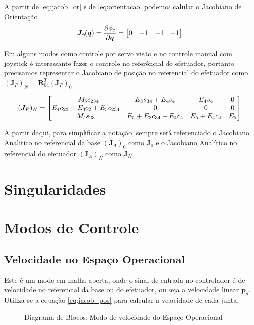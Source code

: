 A partir de \ref{eq:jacob_or} e de \ref{eq:orientacao} podemos calular o Jacobiano de Orientação
\begin{equation}
\bm{J}_{\phi}(\bm{q}) = \frac{\partial \phi_e}{\partial \bm{q}} = \begin{bmatrix}0 & -1 & -1 & -1\end{bmatrix}
\end{equation}
 
Em alguns modos como controle por servo visão e no controle manual com joystick é interessante fazer o controle no referêncial do efetuador, portanto precisamos representar o Jacobiano de posição no referencial do efetuador como $(\bm{J}_P)_N = \bm{R}_{04}^T (\bm{J}_P)_0$.  

\begin{equation}
(\bm{J}_P)_N =  
\begin{bmatrix}
    -M_5c_{234} & E_3s_{34}+E_4s_4 & E_4s_4 & 0 \\
    E_4c_{23}+E_3c_2+E_5c_{234} & 0 & 0 & 0 \\
    M_5s_{23} &  E_5+E_3c_{34}+E_4c_4 & E_5+E_4c_4 & E_5 
\end{bmatrix}
\end{equation}

A partir daqui, para simplificar a notação, sempre será referenciado o Jacobiano Analitico no referencial da base $(\bm{J}_A)_0$  como  $\bm{J}_0$ e o Jacobiano Analítico no referencial do efetuador $(\bm{J}_A)_N$ como $\bm{J}_N$

\section{Singularidades}

\section{Modos de Controle}
\subsection{Velocidade no Espaço Operacional}
Este é um modo em malha aberta, onde o sinal de entrada no controlador é de velocidade no referencial da base ou do efetuador, ou seja a velocidade linear $\bm{\dot{p}}_d$. Utiliza-se a equação \eqref{eq:jacob_pos} para calcular a velocidade de cada junta. 

\begin{figure}[h!]
\centering
{}
\caption{Diagrama de Blocos: Modo de velocidade do Espaço Operacional}
\label{fig:vel_op}
\end{figure}


